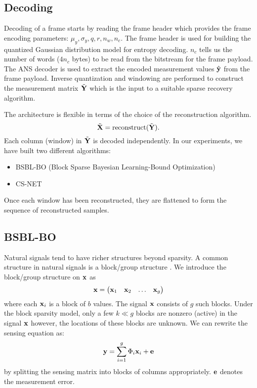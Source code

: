 \subsection{Decoding}
Decoding of a frame starts by reading the frame header
which provides the frame encoding parameters:
$\mu_y, \sigma_y, q, r, n_w, n_c$.
The frame header is used for building
the quantized Gaussian distribution model
for entropy decoding.
$n_c$ tells us the number of words ($4 n_c$ bytes) to be
read from the bitstream for the frame payload.
The ANS decoder is used to extract the encoded measurement
values $\hat{\mathbf{y}}$ from the frame payload.
Inverse quantization and windowing are performed
to construct the measurement matrix $\tilde{\mathbf{Y}}$
which is the input to a suitable sparse recovery algorithm.

The architecture is flexible in terms of the choice of the
reconstruction algorithm.
\begin{equation}
\tilde{\mathbf{X}} = \mathrm{reconstruct}(\tilde{\mathbf{Y}}).
\end{equation}
Each column (window) in $\tilde{\mathbf{Y}}$ is decoded independently.
In our experiments, we have built two different algorithms:
\begin{itemize}
  \item BSBL-BO (Block Sparse Bayesian Learning-Bound Optimization)
  \cite{zhang2013extension,zhang2012compressed,zhang2016comparison}
  \item CS-NET \cite{zhang2021csnet}
\end{itemize}
Once each window has been reconstructed, they are flattened
to form the sequence of reconstructed samples.

\subsection{BSBL-BO}
Natural signals tend to have richer structures beyond
sparsity.
A common structure in natural signals
is a block/group structure \cite{eldar2010block}. 
We introduce the block/group structure on $\mathbf{x}$ as
\begin{equation}
\mathbf{x} = \begin{pmatrix}
\mathbf{x}_1 & \mathbf{x}_2 & \dots & \mathbf{x}_g
\end{pmatrix}
\end{equation}
where each $\mathbf{x}_i$ is a block of $b$ values.
The signal $\mathbf{x}$ consists of $g$ such blocks.
Under the block sparsity model, only a few $k \ll g$
blocks are nonzero (active) in the signal $\mathbf{x}$
however, the locations of these blocks are unknown.
We can rewrite the sensing equation as:
\begin{equation}
\mathbf{y} = \sum_{i=1}^g \Phi_i \mathbf{x}_i + \mathbf{e}
\end{equation}
by splitting the sensing matrix into blocks of columns appropriately.
$\mathbf{e}$ denotes the measurement error.

